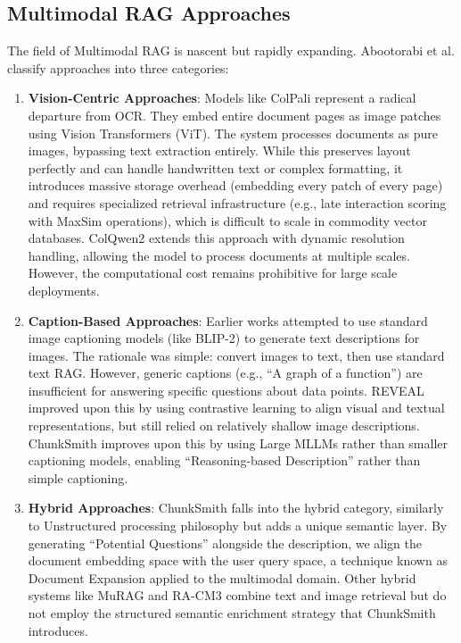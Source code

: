 \documentclass[conference]{IEEEtran}
\begin{document}
\subsection{Multimodal RAG Approaches}
The field of Multimodal RAG is nascent but rapidly expanding. Abootorabi et al. \cite{abootorabi2025ask} classify approaches into three categories:
\begin{enumerate}
    \item \textbf{Vision-Centric Approaches}: Models like ColPali \cite{faysse2024colpali} represent a radical departure from OCR. They embed entire document pages as image patches using Vision Transformers (ViT). The system processes documents as pure images, bypassing text extraction entirely. While this preserves layout perfectly and can handle handwritten text or complex formatting, it introduces massive storage overhead (embedding every patch of every page) and requires specialized retrieval infrastructure (e.g., late interaction scoring with MaxSim operations), which is difficult to scale in commodity vector databases. ColQwen2 extends this approach with dynamic resolution handling, allowing the model to process documents at multiple scales. However, the computational cost remains prohibitive for large scale deployments.
    \item \textbf{Caption-Based Approaches}: Earlier works \cite{hu2023reveal} attempted to use standard image captioning models (like BLIP-2) to generate text descriptions for images. The rationale was simple: convert images to text, then use standard text RAG. However, generic captions (e.g., ``A graph of a function'') are insufficient for answering specific questions about data points. REVEAL \cite{hu2023reveal} improved upon this by using contrastive learning to align visual and textual representations, but still relied on relatively shallow image descriptions. ChunkSmith improves upon this by using Large MLLMs rather than smaller captioning models, enabling ``Reasoning-based Description'' rather than simple captioning.
    \item \textbf{Hybrid Approaches}: ChunkSmith falls into the hybrid category, similarly to Unstructured processing philosophy but adds a unique semantic layer. By generating ``Potential Questions'' alongside the description, we align the document embedding space with the user query space, a technique known as Document Expansion \cite{nogueira2019document} applied to the multimodal domain. Other hybrid systems like MuRAG \cite{chen2022murag} and RA-CM3 \cite{yasunaga2023retrieval} combine text and image retrieval but do not employ the structured semantic enrichment strategy that ChunkSmith introduces.
\end{enumerate}
\end{document}
